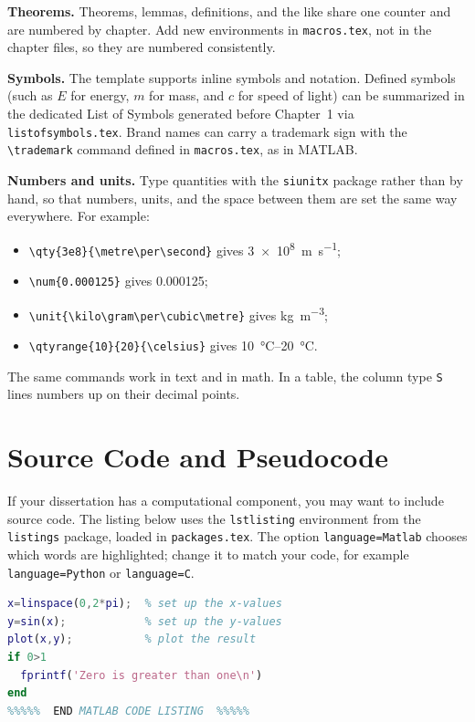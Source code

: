 \textbf{Theorems.} Theorems, lemmas, definitions, and the like share one counter and are numbered by chapter. Add new environments in \texttt{macros.tex}, not in the chapter files, so they are numbered consistently.


\textbf{Symbols.} The template supports inline symbols and notation. Defined symbols (such as $E$ for energy, $m$ for mass, and $c$ for speed of light) can be summarized in the dedicated List of Symbols generated before Chapter~1 via \texttt{listofsymbols.tex}. Brand names can carry a trademark sign with the \verb+\trademark+ command defined in \texttt{macros.tex}, as in MATLAB\trademark.

\textbf{Numbers and units.} Type quantities with the \texttt{siunitx} package rather than by hand, so that numbers, units, and the space between them are set the same way everywhere. For example:
\begin{itemize}
\item \verb+\qty{3e8}{\metre\per\second}+ gives \qty{3e8}{\metre\per\second};
\item \verb+\num{0.000125}+ gives \num{0.000125};
\item \verb+\unit{\kilo\gram\per\cubic\metre}+ gives \unit{\kilo\gram\per\cubic\metre};
\item \verb+\qtyrange{10}{20}{\celsius}+ gives \qtyrange{10}{20}{\celsius}.
\end{itemize}
The same commands work in text and in math. In a table, the column type \texttt{S} lines numbers up on their decimal points.

\section{Source Code and Pseudocode}
\label{sec:source_code}

If your dissertation has a computational component, you may want to include source code. The listing below uses the \texttt{lstlisting} environment from the \texttt{listings} package, loaded in \texttt{packages.tex}. The option \texttt{language=Matlab} chooses which words are highlighted; change it to match your code, for example \texttt{language=Python} or \texttt{language=C}.

\begin{lstlisting}[language=Matlab]
%%%%% BEGIN MATLAB CODE LISTING %%%%%
x=linspace(0,2*pi);  % set up the x-values
y=sin(x);            % set up the y-values
plot(x,y);           % plot the result
if 0>1
  fprintf('Zero is greater than one\n')
end
%%%%%  END MATLAB CODE LISTING  %%%%%
\end{lstlisting}

